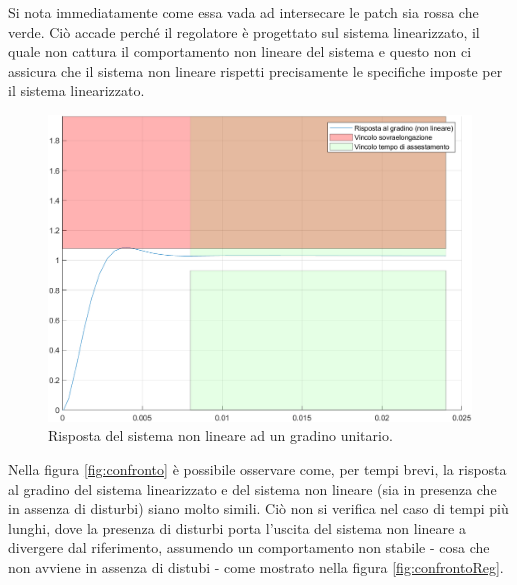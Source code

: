 \documentclass[a4paper, 11pt]{article}
\begin{document}
Si nota immediatamente come essa vada ad intersecare le patch sia rossa che verde. Ciò accade perché il regolatore è progettato sul sistema linearizzato, il quale non cattura il comportamento non lineare del sistema
e questo non ci assicura che il sistema non lineare rispetti precisamente le specifiche imposte per il sistema linearizzato.

\begin{figure}[h!]
	\centering
	\includegraphics[width=0.75\linewidth]{./images/stepRespNonLinUni.png}
	\caption{Risposta del sistema non lineare ad un gradino unitario.}
	\label{fig:step_response_non_lin_uni}
\end{figure}

Nella figura \ref*{fig:confronto} è possibile osservare come, per tempi brevi, la risposta al gradino del sistema linearizzato e del sistema non lineare (sia in presenza che in assenza di disturbi) siano molto simili.
Ciò non si verifica nel caso di tempi più lunghi, dove la presenza di disturbi porta l'uscita del sistema non lineare a divergere dal riferimento, assumendo un comportamento non stabile - cosa che non avviene in assenza di distubi -
come mostrato nella figura \ref*{fig:confrontoReg}.
\end{document}

